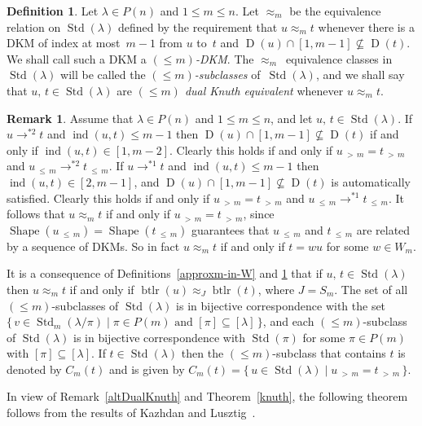 \documentclass[10pt]{amsart}
\theoremstyle{definition}
\newtheorem{defi}[theo]{Definition}
\newtheorem{rema}[theo]{Remark}
\DeclareMathOperator{\word}{btlr}
\newcommand{\morethan}[2]{#1\,{_{>\,#2}}}
\newcommand{\Lessthan}[2]{#1\,{_{\leqslant\,#2}}}
\DeclareMathOperator{\STD}{Std}
\DeclareMathOperator{\shape}{Shape}
\DeclareMathOperator{\ind}{ind}
\DeclareMathOperator{\D}{D}
\begin{document}
\begin{defi}\label{approxm-dfn}
Let $\lambda\in P(n)$ and $1\leqslant m\leqslant n$. Let $\approx_m$
be the equivalence relation on $\STD(\lambda)$ defined by the
requirement that $u\approx_m t$ whenever there is a DKM
of index at most~$m-1$ from $u$ to~$t$ and
$\D(u)\cap[1,m-1]\nsubseteq\D(t)$. We shall call such a DKM a
\emph{$(\leqslant m)$-DKM}.
The $\approx_m$~equivalence classes in $\STD(\lambda)$ will be called the
\emph{$(\leqslant m)$-subclasses}
of~$\STD(\lambda)$, and we shall say that $u,\,t\in\STD(\lambda)$ are
\emph{$(\leqslant m)$ dual Knuth equivalent} whenever $u\approx_m t$.
\end{defi}

\begin{rema}\label{approxm-rmk}
Assume that $\lambda\in P(n)$ and $1\leqslant m\leqslant n$, and
let $u,\,t\in\STD(\lambda)$. If $u\to^{*2}t$ and $\ind(u,t)\leqslant m-1$
then $\D(u)\cap[1,m-1]\nsubseteq\D(t)$ if and only if $\ind(u,t)\in[1,m-2]$.
Clearly this holds if and only if $\morethan um=\morethan tm$ and
$\Lessthan um\to^{*2}\Lessthan tm$. If $u\to^{*1}t$ and $\ind(u,t)\leqslant m-1$
then $\ind(u,t)\in[2,m-1]$, and $\D(u)\cap[1,m-1]\nsubseteq\D(t)$ is
automatically satisfied. Clearly this holds if and only if
$\morethan um=\morethan tm$ and $\Lessthan um\to^{*1}\Lessthan tm$.
It follows that $u\approx_m t$ if and only if $\morethan um=\morethan tm$,
since $\shape(\Lessthan um)=\shape(\Lessthan tm)$ guarantees that
$\Lessthan um$ and $\Lessthan tm$ are related by a sequence of
DKMs. So in fact $u\approx_m t$ if and only if $t=wu$
for some $w\in W_m$.
\end{rema}
It is a consequence of Definitions~\ref{approxm-in-W} and \ref{approxm-dfn}
that if $u,\,t\in\STD(\lambda)$ then $u\approx_m t$ if and only if
$\word(u)\approx_J \word(t)$, where $J=S_m$. The set of all
$(\leqslant m)$-subclasses of $\STD(\lambda)$ is in bijective correspondence
with the set $\{\,v\in\STD_m(\lambda/\pi)\mid \pi\in P(m) \text{ and }
[\pi]\subseteq[\lambda]\,\}$, and each $(\leqslant m)$-subclass of
$\STD(\lambda)$ is in bijective correspondence with
$\STD(\pi)$ for some $\pi\in P(m)$ with $[\pi]\subseteq[\lambda]$.
If $t\in\STD(\lambda)$ then the $(\leqslant m)$-subclass that contains
$t$ is denoted by $C_m(t)$ and is given by
$C_m(t) = \{\,u\in\STD(\lambda) \mid\morethan um = \morethan tm\,\}$.

In view of Remark~\ref{altDualKnuth} and Theorem~\ref{knuth}, the following
theorem follows from the results of Kazhdan and
Lusztig~\cite[\S5]{kazlus:coxhecke}.
\end{document}
